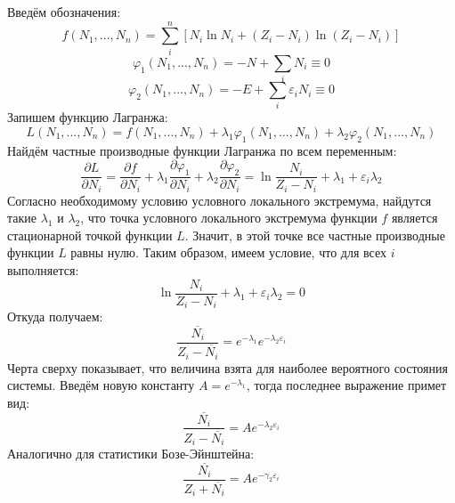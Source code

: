 \documentclass[A4]{article}
\begin{document}
    Введём обозначения:
    \begin{equation*}
        f(N_1, ..., N_n) = \sum\limits_{i}^{n} [N_i\ln{N_i} + (Z_i - N_i)\ln{(Z_i - N_i)}]
    \end{equation*}
    \begin{equation*}
        \varphi_1(N_1, ..., N_n) = - N + \sum\limits_{i} N_i \equiv 0
    \end{equation*}
    \begin{equation*}
        \varphi_2(N_1, ..., N_n) = - E + \sum\limits_{i} \varepsilon_i N_i \equiv 0
    \end{equation*}
    Запишем функцию Лагранжа:
    \begin{equation*}
        L(N_1, ..., N_n) = f(N_1, ..., N_n) + \lambda_1\varphi_1(N_1, ..., N_n) +
        \lambda_2\varphi_2(N_1, ..., N_n)
    \end{equation*}
    Найдём частные производные функции Лагранжа по всем переменным:
    \begin{equation*}
        \frac{\partial L}{\partial N_i} = \frac{\partial f}{\partial N_i} +
        \lambda_1\frac{\partial \varphi_1}{\partial N_i} +
        \lambda_2\frac{\partial \varphi_2}{\partial N_i} =
        \ln{\frac{N_i}{Z_i - N_i}} + \lambda_1 + \varepsilon_i\lambda_2
    \end{equation*}
    Согласно необходимому условию условного локального экстремума, найдутся такие $\lambda_1$ и
    $\lambda_2$, что точка условного локального экстремума функции $f$ является стационарной точкой
    функции $L$. Значит, в этой точке все частные производные функции $L$ равны нулю. Таким образом,
    имеем условие, что для всех $i$ выполняется:
    \begin{equation*}
        \ln{\frac{N_i}{Z_i - N_i}} + \lambda_1 + \varepsilon_i\lambda_2 = 0
    \end{equation*}
    Откуда получаем:
    \begin{equation*}
        \frac{\overline{N_i}}{Z_i - \overline{N_i}} = e^{-\lambda_1}e^{-\lambda_2\varepsilon_i}
    \end{equation*}
    Черта сверху показывает, что величина взята для наиболее вероятного состояния системы.
    Введём новую константу $A = e^{-\lambda_1}$, тогда последнее выражение примет вид:
    \begin{equation*}
        \frac{\overline{N_i}}{Z_i - \overline{N_i}} = Ae^{-\lambda_2\varepsilon_i}
    \end{equation*}
    Аналогично для статистики Бозе-Эйнштейна:
    \begin{equation*}
        \frac{\overline{N_i}}{Z_i + \overline{N_i}} = Ae^{-\gamma_2\varepsilon_i}
    \end{equation*}
\end{document}
